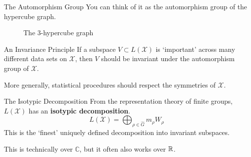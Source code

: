 \documentclass[xcolor=dvipsnames]{beamer}
\newcommand*{\xs}{\mathcal{X}}
\begin{document}
\begin{frame}{The Automorphism Group}
    You can think of it as the automorphism group of the hypercube graph.
    \begin{figure}[h]
        \centering


        \caption{The $3$-hypercube graph}
        \label{fig:hypercube}
    \end{figure}
\end{frame}

\begin{frame}{An Invariance Principle}
    If a subspace $V \subset L(\xs)$ is `important' across many different data sets
    on $\xs$, then $V$ should be invariant under the automorphism group of
    $\xs$.

    More generally, statistical procedures should respect the symmetries of
    $\xs$.
\end{frame}

\begin{frame}{The Isotypic Decomposition}
    From the representation theory of finite groups, \\
    $L(\xs)$ has an \textbf{isotypic decomposition}.
    \[
        L(\xs) = \bigoplus_{\rho \in \widehat{G}} m_\rho W_\rho
    \]
    This is the `finest' uniquely defined decomposition into invariant
    subspaces.
    
    \lspace
    {\footnotesize
        This is technically over $\mathbb C$, but it often also works over $\mathbb{R}$.
    }
\end{frame}
\end{document}
